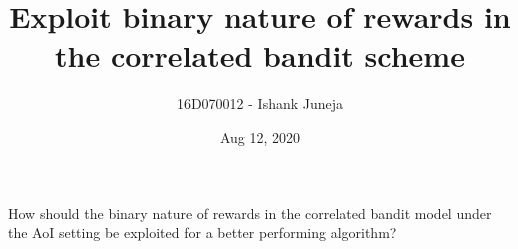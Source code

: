 \documentclass{article}
\title{Exploit binary nature of rewards in the correlated bandit scheme}
\author{16D070012 - Ishank Juneja}
\date{Aug 12, 2020}
\begin{document}
\maketitle

How should the binary nature of rewards in the correlated bandit model under the AoI setting be exploited for a better performing algorithm?
\end{document}
